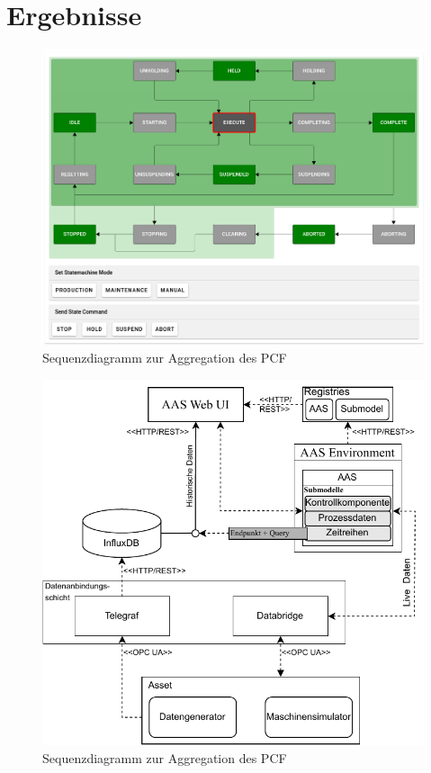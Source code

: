 \section{Ergebnisse}
\newpage
\begin{figure}[htbp]
    \centering
        \includegraphics[width=1\textwidth]{Bilder/Ergebnisse/2025-07-23_15-06.png}
    
    \caption{Sequenzdiagramm zur Aggregation des PCF}
    \label{fig:SequenzdiagrammPCF}
\end{figure}

\begin{figure}[htbp]
    \centering
        \includegraphics[width=1\textwidth]{Bilder/Ergebnisse/DynamischeDaten/Architektur.pdf}
    
    \caption{Sequenzdiagramm zur Aggregation des PCF}
    \label{fig:SequenzdiagrammPCF}
\end{figure}


